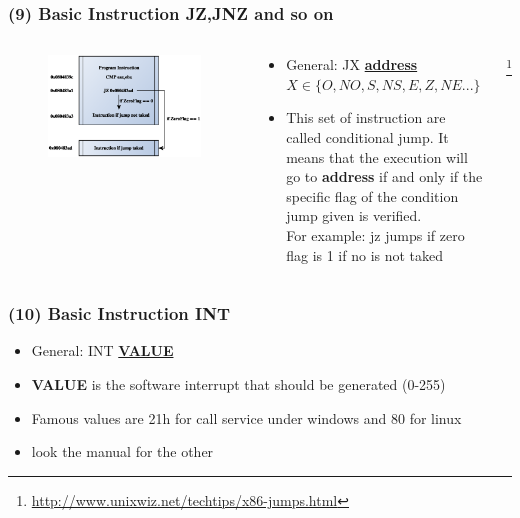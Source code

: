 \documentclass[]{beamer}
\begin{document}
		\begin{frame}
			\frametitle{(9) Basic Instruction JZ,JNZ and so on}
				\begin{columns}
					\begin{column}[left]{2.5in}
						\begin{figure}
							\includegraphics[width=\textwidth]{images/j_unc.eps}									      \label{control}
							\label{Control Flow JZ}
						\end{figure}
					\end{column}
					\begin{column}[right]{2.5in}
						\begin{itemize}
							\item{General: JX \underline{\textbf{address}}}\\
							$ X \in \{O,NO,S,NS,E,Z,NE...\}$\\
							\item{This set of instruction are called conditional jump. It means that the execution will go to \textbf{address} if and only if the specific flag of the condition jump given is verified.\\For example: jz jumps if zero flag is 1 if no is not taked}						\end{itemize}
					\end{column}\footnote{\url{http://www.unixwiz.net/techtips/x86-jumps.html}}

				\end{columns}
		\end{frame}
		\begin{frame}
			\frametitle{(10) Basic Instruction INT}
				\begin{itemize}
					\item{General: INT \underline{\textbf{VALUE}}}\\
					\item{\textbf{VALUE} is the software interrupt that should be generated (0-255)}
					\item{Famous values are 21h for call service under windows and 80 for linux}
					\item{look the manual for the other } 
				\end{itemize}
		\end{frame}
			
\end{document}
